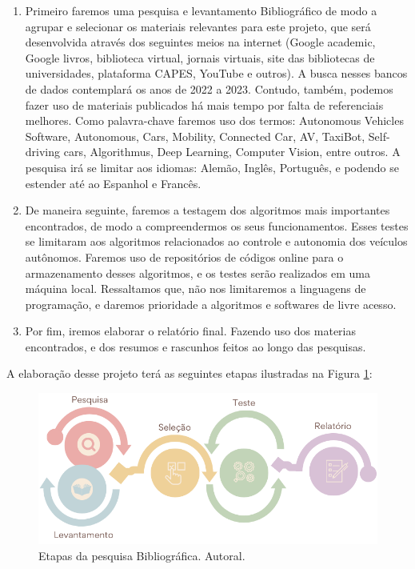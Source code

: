 \documentclass{article}
\begin{document}
\begin{enumerate}
\item Primeiro faremos uma pesquisa e levantamento Bibliográfico de modo a agrupar e selecionar os materiais relevantes para este projeto, que será desenvolvida através dos seguintes meios na internet (Google academic, Google livros, biblioteca virtual, jornais virtuais, site das bibliotecas de universidades, plataforma CAPES, YouTube e outros). A busca nesses bancos de dados contemplará os anos de 2022 a 2023. Contudo, também, podemos fazer uso de materiais publicados há mais tempo por falta de referenciais melhores. Como palavra-chave faremos uso dos termos: Autonomous Vehicles Software, Autonomous, Cars, Mobility, Connected Car, AV, TaxiBot, Self-driving cars, Algorithmus, Deep Learning, Computer Vision, entre outros.  A pesquisa irá se limitar aos idiomas: Alemão, Inglês, Português, e podendo se estender até ao Espanhol e Francês.

\item De maneira seguinte, faremos a testagem dos algoritmos mais importantes encontrados, de modo a compreendermos os seus funcionamentos. Esses testes se limitaram aos algoritmos relacionados ao controle e autonomia dos veículos autônomos. Faremos uso de repositórios de códigos online para o armazenamento desses algoritmos, e os testes serão realizados em uma máquina local. Ressaltamos que, não nos limitaremos a linguagens de programação, e daremos prioridade a algoritmos e softwares de livre acesso.
\item Por fim, iremos elaborar o relatório final. Fazendo uso dos materias encontrados, e dos resumos e rascunhos feitos ao longo das pesquisas.
\end{enumerate}

A elaboração desse projeto terá as seguintes etapas ilustradas na Figura \ref{img_bibli}:

\begin{figure}[H]
\centering
\includegraphics[width=14cm]{Figures/methodology.png}
\caption{Etapas da pesquisa Bibliográfica. Autoral.}
\label{img_bibli}
\end{figure}
\end{document}
